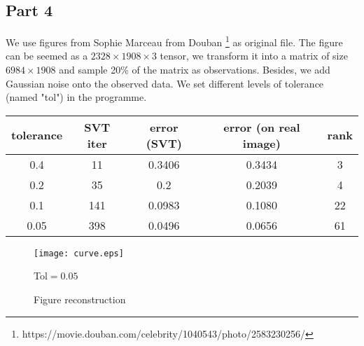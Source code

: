 \documentclass[conference,onecolumn,12pt]{IEEEtran}
\numberwithin{equation}{section}
\numberwithin{figure}{section}
\numberwithin{table}{section}
\theoremstyle{definition}
\begin{document}
\subsection{Part 4}
We use figures from Sophie Marceau from Douban \footnote{https://movie.douban.com/celebrity/1040543/photo/2583230256/} as original file. The figure can be seemed as a $2328\times 1908\times 3$ tensor, we transform it into a matrix of size $6984\times 1908$ and sample 20\% of the matrix as observations. Besides, we add Gaussian noise onto the observed data. We set different levels of tolerance (named "tol") in the programme.



\begin{table}[htbp]
  \centering
  \begin{tabular}{ccccc}
    \toprule
    tolerance & SVT iter & error (SVT) &error (on real image) & rank\\
    \midrule
    0.4 & 11&0.3406&0.3434&3\\
    0.2 & 35 & 0.2 & 0.2039 & 4\\
    0.1 & 141 & 0.0983 & 0.1080 & 22\\
    0.05 & 398 & 0.0496 & 0.0656 & 61\\
    \bottomrule
  \end{tabular}
\end{table}


\begin{figure}[htbp]
  \centering
  \texttt{[image: curve.eps]}
  \caption{Tol$=0.05$}
\end{figure}

  \begin{figure}[H]
    \centering
    \hspace{0.5in} %
      \hspace{0.5in}
    \hspace{0.5in}
    \caption{Figure reconstruction}
    \label{fig:fig}
  \end{figure}
  



  
  
  
\end{document}
